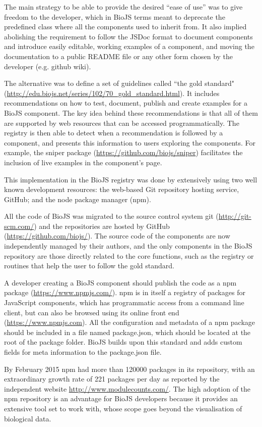 The main strategy to be able to provide the desired ``ease of use'' was to give freedom to the developer, which in BioJS terms meant to deprecate the predefined class where all the components used to inherit from. It also implied abolishing the requirement to follow the JSDoc format to document components and introduce easily editable, working examples of a component, and moving the documentation to a public README file or any other form chosen by the developer (e.g. github wiki).

The alternative was to define a set of guidelines called ``the gold standard" (\url{http://edu.biojs.net/series/102/70_gold_standard.html}). It includes recommendations on how to test, document, publish and create examples for a BioJS component. The key idea behind these recommendations is that all of them are supported by web resources that can be accessed programmatically. The registry is then able to detect when a recommendation is followed by a component, and presents this information to users exploring the components. For example, the sniper package (\url{https://github.com/biojs/sniper}) facilitates the inclusion of live examples in the component's page.

This implementation in the BioJS registry was done by extensively using two well known development resources: the web-based Git repository hosting service, GitHub; and the node package manager (npm). 

All the code of BioJS was migrated to the source control system git (\url{http://git-scm.com/}) and the repositories are hosted by GitHub (\url{https://github.com/biojs/}). The source code of the components are now independently managed by their authors, and the only components in the BioJS repository are those directly related to the core functions, such as the registry or routines that help the user to follow the gold standard.

A developer creating a BioJS component should publish the code as a npm package (\url{https://www.npmjs.com/}). npm is in itself a registry of packages for JavaScript components, which has programmatic access from a command line client, but can also be browsed using its online front end (\url{https://www.npmjs.com}). All the configuration and metadata of a npm package should be included in a file named package.json, which should be located at the root of the package folder. BioJS builds upon this standard and adds custom fields for meta information to the package.json file.

By February 2015 npm had more than 120000 packages in its repository, with an extraordinary growth rate of 221 packages per day as reported by the independent website \url{http://www.modulecounts.com/}. The high adoption of the npm repository is an advantage for BioJS developers because it provides an extensive tool set to work with, whose scope goes beyond the visualisation of biological data.


